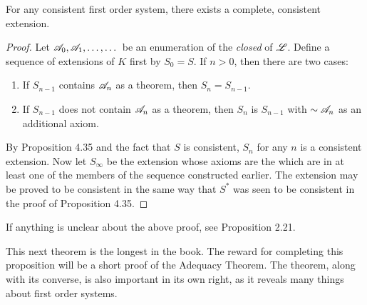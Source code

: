   \begin{proposition}
    For any consistent first order system, there exists a complete, consistent extension.

    \begin{proof}
      Let \(\mathscr{A}_0, \mathscr{A}_1, \dots, \dots\) be an enumeration of the \textit{closed} \wfs{} of \(\mathscr{L}\). Define a sequence of extensions of \(K\) first by \(S_0 = S\). If \(n > 0\), then there are two cases:
      \begin{enumerate}
        \item If \(S_{n - 1}\) contains \(\mathscr{A}_n\) as a theorem, then \(S_n = S_{n - 1}\).
        \item If \(S_{n - 1}\) does not contain \(\mathscr{A}_n\) as a theorem, then \(S_n\) is \(S_{n - 1}\) with \(\sim\mathscr{A}_n\) as an additional axiom. 
      \end{enumerate}

      By Proposition 4.35 and the fact that \(S\) is consistent, \(S_n\) for any \(n\) is a consistent extension. Now let \(S_\infty\) be the extension whose axioms are the \wfs{} which are in at least one of the members of the sequence constructed earlier. The extension may be proved to be consistent in the same way that \(S^*\) was seen to be consistent in the proof of Proposition 4.35.
    \end{proof}
  \end{proposition}

  If anything is unclear about the above proof, see Proposition 2.21.

  This next theorem is the longest in the book. The reward for completing this proposition will be a short proof of the Adequacy Theorem. The theorem, along with its converse, is also important in its own right, as it reveals many things about first order systems.

